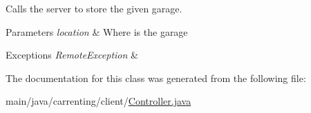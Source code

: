 Calls the server to store the given garage.


\begin{DoxyParams}{Parameters}
{\em location} & Where is the garage \\
\hline
\end{DoxyParams}

\begin{DoxyExceptions}{Exceptions}
{\em Remote\+Exception} & \\
\hline
\end{DoxyExceptions}


The documentation for this class was generated from the following file\+:\begin{DoxyCompactItemize}
\item 
main/java/carrenting/client/\mbox{\hyperlink{_controller_8java}{Controller.\+java}}\end{DoxyCompactItemize}
